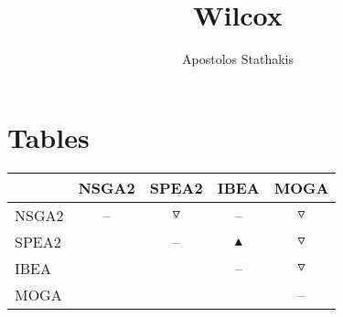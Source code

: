 \documentclass{article}
\title{Wilcox}
\author{Apostolos Stathakis}
\begin{document}
 \maketitle
 \section{Tables}
 \begin{table}
 \centering \begin{tabular}{l c c c c }
  \hline & NSGA2 & SPEA2 & IBEA & MOGA \\
 \hline  NSGA2 &  --  & $\triangledown$ &  --  & $\triangledown$ \\
  SPEA2 &   &  --  & $\blacktriangle$ & $\triangledown$ \\
  IBEA &   &   &  --  & $\triangledown$ \\
  MOGA &   &   &   &  --  \\
 \hline
 \end{tabular}
 \end{table}
 
\end{document}
